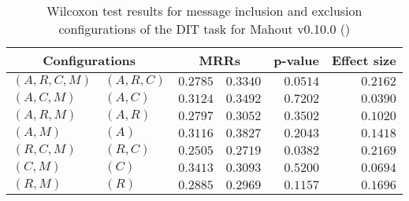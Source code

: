 
\begin{table}
\begin{spacing}{1.2}
\centering
\caption{Wilcoxon test results for message inclusion and exclusion configurations of the DIT task for Mahout v0.10.0 (\ctwo)}
\label{table:versus-wilcox-mahout-dit-message}
\begin{tabular}{ll|rr|rr}
\toprule
      \multicolumn{2}{c|}{Configurations} &                \multicolumn{2}{c|}{MRRs} &             p-value & Effect size \\
\midrule
 $(A,R,C,M)$ &  $(A,R,C)$ &       $0.2785$ &  $\bm{0.3340}$ & $0.0514$ &    $0.2162$ \\
   $(A,C,M)$ &    $(A,C)$ &       $0.3124$ &  $\bm{0.3492}$ & $0.7202$ &    $0.0390$ \\
   $(A,R,M)$ &    $(A,R)$ &       $0.2797$ &  $\bm{0.3052}$ & $0.3502$ &    $0.1020$ \\
     $(A,M)$ &      $(A)$ &       $0.3116$ &  $\bm{0.3827}$ & $0.2043$ &    $0.1418$ \\
   $(R,C,M)$ &    $(R,C)$ &       $0.2505$ &  $\bm{0.2719}$ & $0.0382$ &    $0.2169$ \\
     $(C,M)$ &      $(C)$ &  $\bm{0.3413}$ &       $0.3093$ & $0.5200$ &    $0.0694$ \\
     $(R,M)$ &      $(R)$ &       $0.2885$ &  $\bm{0.2969}$ & $0.1157$ &    $0.1696$ \\
\bottomrule
\end{tabular}

\end{spacing}
\end{table}


